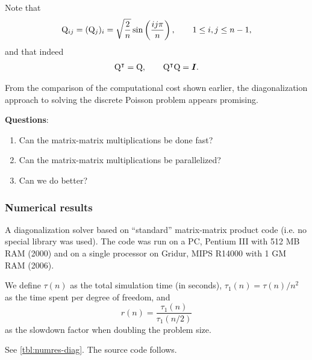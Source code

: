Note that
\begin{align*}
 {\mathrm Q}_{ij}
  &= ({\mathrm Q}_j)_i = \sqrt{\frac{2}{n}} \sin \left( \frac{ij \pi}{n} \right),
    \qquad 1 \leq i,j \leq n-1, \\
\end{align*}
and that indeed
\begin{align*}
  {\mathrm Q}^\intercal = {\mathrm Q}, \qquad {\mathrm Q}^\intercal {\mathrm Q} = \boldsymbol I.
\end{align*}

From the comparison of the computational cost shown earlier, the diagonalization
approach to solving the discrete Poisson problem appears promising.

\textbf{Questions}:
\begin{enumerate}
\item Can the matrix-matrix multiplications be done fast?
\item Can the matrix-matrix multiplications be parallelized?
\item Can we do better?
\end{enumerate}

\subsubsection{Numerical results}

A diagonalization solver based on ``standard'' matrix-matrix product code (i.e.
no special library was used). The code was run on a PC, Pentium III with 512 MB
RAM (2000) and on a single processor on Gridur, MIPS R14000 with 1 GM RAM
(2006).

We define $\tau(n)$ as the total simulation time (in seconds), $\tau_1(n) =
\tau(n)/n^2$ as the time spent per degree of freedom, and
\[
  r(n) = \frac{\tau_1(n)}{\tau_1(n/2)}
\]
as the slowdown factor when doubling the problem size.

See \autoref{tbl:numres-diag}. The source code follows.

